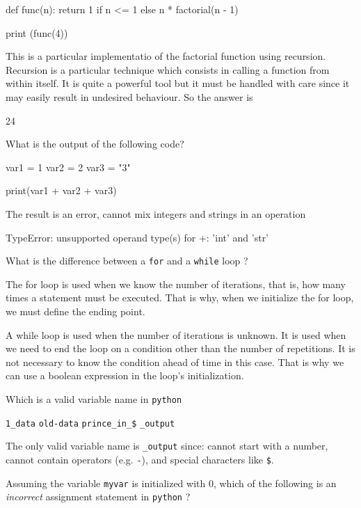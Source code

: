 \documentclass[12pt,a4paper]{exam}
\begin{document}
\begin{questions}
\begin{ipython}
def func(n):
    return 1 if n <= 1 else n * factorial(n - 1)

print (func(4))
\end{ipython}
\fillwithlines{3cm}
\begin{solution}
This is a particular implementatio of the factorial function using recursion. Recursion is a particular technique which consists in
calling a function from within itself. It is quite a powerful tool but it must be handled with care since it may easily result in
undesired behaviour. So the answer is
\begin{ioutput}
24
\end{ioutput}
\end{solution}
\question
What is the output of the following code?

\begin{ipython}
var1 = 1
var2 = 2
var3 = "3"

print(var1 + var2 + var3)
\end{ipython}
\fillwithlines{3cm}
\begin{solution}
The result is an error, cannot mix integers and strings in an operation
\begin{ioutput}
TypeError: unsupported operand type(s) for +: 'int' and 'str'
\end{ioutput}
\end{solution}
\question
What is the difference between a \texttt{for} and a \texttt{while} loop ?
\fillwithlines{3cm}
\begin{solution}
The for loop is used when we know the number of iterations, that is, how many times a statement must be executed. That is why, when we initialize the for loop, we must define the ending point.

A while loop is used when the number of iterations is unknown. It is used when we need to end the loop on a condition other than the number of repetitions. It is not necessary to know the condition ahead of time in this case. That is why we can use a boolean expression in the loop's initialization.
\end{solution}
\question
Which is a valid variable name in \texttt{python} 

\begin{checkboxes}
\choice \texttt{1\_data}
\choice \texttt{old-data}
\choice \texttt{prince\_in\_\$}
\choice \texttt{\_output}
\end{checkboxes}
\begin{solution}
The only valid variable name is \texttt{\_output} since: cannot start with a number, cannot contain operators (e.g. \texttt{-}), and special characters like \texttt{\$}.
\end{solution}
\question
Assuming the variable \texttt{myvar} is initialized with 0, which of the following is an \emph{incorrect} assignment statement
in \texttt{python} ?


\end{questions}
\end{document}
